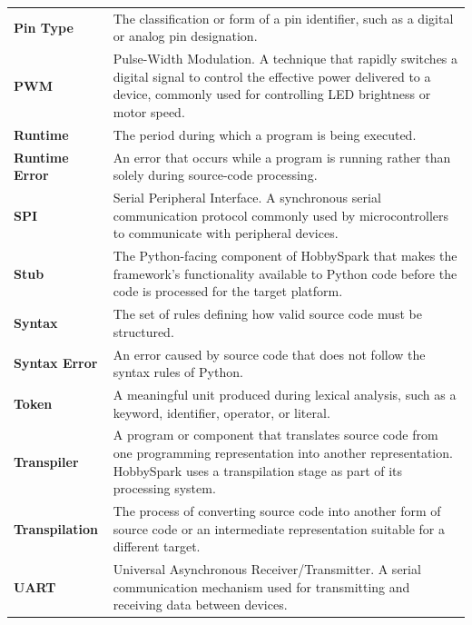 \documentclass[11pt]{book}
\begin{document}
\begin{longtable}{p{} p{}}
    \textbf{Pin Type} &
    The classification or form of a pin identifier, such as a digital or analog pin designation. \\

    \textbf{PWM} &
    Pulse-Width Modulation. A technique that rapidly switches a digital signal to control the effective power delivered to a device, commonly used for controlling LED brightness or motor speed. \\

    \textbf{Runtime} &
    The period during which a program is being executed. \\

    \textbf{Runtime Error} &
    An error that occurs while a program is running rather than solely during source-code processing. \\

    \textbf{SPI} &
    Serial Peripheral Interface. A synchronous serial communication protocol commonly used by microcontrollers to communicate with peripheral devices. \\

    \textbf{Stub} &
    The Python-facing component of HobbySpark that makes the framework's functionality available to Python code before the code is processed for the target platform. \\

    \textbf{Syntax} &
    The set of rules defining how valid source code must be structured. \\

    \textbf{Syntax Error} &
    An error caused by source code that does not follow the syntax rules of Python. \\

    \textbf{Token} &
    A meaningful unit produced during lexical analysis, such as a keyword, identifier, operator, or literal. \\

    \textbf{Transpiler} &
    A program or component that translates source code from one programming representation into another representation. HobbySpark uses a transpilation stage as part of its processing system. \\

    \textbf{Transpilation} &
    The process of converting source code into another form of source code or an intermediate representation suitable for a different target. \\

    \textbf{UART} &
    Universal Asynchronous Receiver/Transmitter. A serial communication mechanism used for transmitting and receiving data between devices. \\


\end{longtable}
\end{document}
